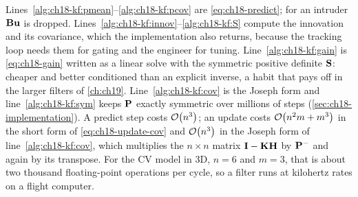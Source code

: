 \begin{algorithm}[htb]
\caption{The Kalman filter: one predict step and one update step}
\label{alg:ch18-kf}
\end{algorithm}

Lines~\ref{alg:ch18-kf:pmean}--\ref{alg:ch18-kf:pcov} are
\cref{eq:ch18-predict}; for an intruder $\mathbf{B}\mathbf{u}$ is dropped.
Lines~\ref{alg:ch18-kf:innov}--\ref{alg:ch18-kf:S} compute the innovation and
its covariance, which the implementation also returns, because the tracking
loop needs them for gating and the engineer for tuning.
Line~\ref{alg:ch18-kf:gain} is \cref{eq:ch18-gain} written as a linear solve
with the symmetric positive definite $\mathbf{S}$: cheaper and better
conditioned than an explicit inverse, a habit that pays off in the larger
filters of \cref{ch:ch19}. Line~\ref{alg:ch18-kf:cov} is the Joseph form and
line~\ref{alg:ch18-kf:sym} keeps $\mathbf{P}$ exactly symmetric over millions of
steps (\cref{sec:ch18-implementation}). A predict step costs $\mathcal{O}\!\left(n^3\right)$; an
update costs $\mathcal{O}\!\left(n^2m+m^3\right)$ in the short form of \cref{eq:ch18-update-cov}
and $\mathcal{O}\!\left(n^3\right)$ in the Joseph form of line~\ref{alg:ch18-kf:cov}, which
multiplies the $n\times n$ matrix $\mathbf{I}-\mathbf{K}\mathbf{H}$ by $\mathbf{P}^-$ and
again by its transpose. For the CV model in 3D, $n=6$ and $m=3$, that is
about two thousand floating-point operations per cycle, so a filter runs at
kilohertz rates on a flight computer.

